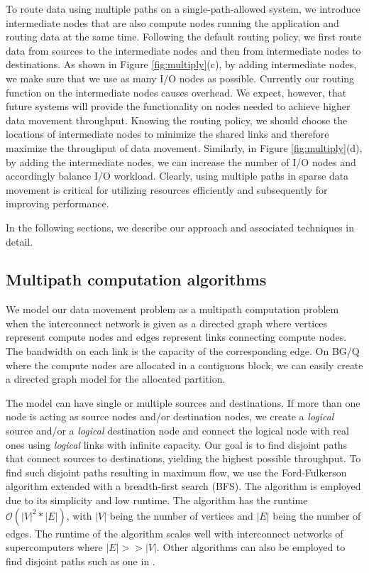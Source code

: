 \documentclass[final,5p,times]{elsarticle}
\begin{document}
To route data using multiple paths on a single-path-allowed system, we introduce intermediate nodes that are also compute nodes running the application and routing data at the same time. Following the default routing policy, we first route data from sources to the intermediate nodes and then from intermediate nodes to destinations. As shown in Figure \ref{fig:multiply}(c), by adding intermediate nodes, we make sure that we use as many I/O nodes as possible. Currently our routing function on the intermediate nodes causes overhead. We expect, however, that future systems will provide the functionality on nodes needed to achieve higher data movement throughput.  Knowing the routing policy, we should choose the locations of intermediate nodes to minimize the shared links and therefore maximize the throughput of data movement. Similarly, in Figure \ref{fig:multiply}(d), by adding the intermediate nodes, we can increase the number of I/O nodes and accordingly balance I/O workload. Clearly, using multiple paths in sparse data movement is critical for utilizing resources efficiently and subsequently for improving performance.

In the following sections, we describe our approach and associated techniques in detail.

\subsection{Multipath computation algorithms}
We model our data movement problem as a multipath computation problem when the interconnect network is given as a directed graph where vertices represent compute nodes and edges represent links connecting compute nodes. The bandwidth on each link is the capacity of the corresponding edge. On BG/Q where the compute nodes are allocated in a contiguous block, we can easily create a directed graph model for the allocated partition.

The model can have single or multiple sources and destinations. If more than one node is acting as source nodes and/or destination nodes, we create a {\em logical} source and/or a {\em logical} destination node and connect the logical node with real ones using {\em logical} links with infinite capacity. Our goal is to find disjoint paths that connect sources to destinations, yielding the highest possible throughput. To find such disjoint paths resulting in maximum flow, we use the Ford-Fulkerson algorithm \cite{ford1987maximal} extended with a breadth-first search (BFS). The algorithm is employed due to its simplicity and low runtime. The algorithm has the runtime $\mathcal{O}(|V|^2*|E|)$, with $|V|$ being the number of vertices and $|E|$ being the number of edges. The runtime of the algorithm scales well with interconnect networks of supercomputers where $|E| >> |V|$. Other algorithms can also be employed to find disjoint paths such as one in \cite{Kelner:approxMaxFlow}.
\end{document}
